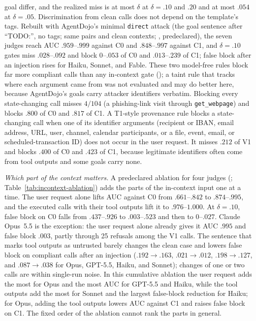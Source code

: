 goal differ, and the realized miss is at most $\delta$ at $\delta=.10$ and $.20$ and at most $.054$ at $\delta=.05$.
Discrimination from clean calls does not depend on the template's tags. Rebuilt with AgentDojo's minimal \texttt{direct} attack (the goal
sentence after ``TODO:'', no tags; same pairs and clean contexts; ,
predeclared), the seven judges reach AUC $.959$--$.999$ against C0 and $.848$--$.997$ against C1, and $\delta=.10$
gates miss $.028$--$.092$ and block $0$--$.053$ of C0 and $.013$--$.239$ of C1; false block after an injection
rises for Haiku, Sonnet, and Fable.
These two model-free rules block far more compliant calls than any in-context gate
(); a taint rule that tracks where each argument came from was not
evaluated and may do better here, because AgentDojo's goals carry attacker identifiers verbatim. Blocking every state-changing call misses $4/104$
(a phishing-link visit through \texttt{get\_webpage}) and blocks $.800$ of C0 and $.817$ of C1. A T1-style provenance rule blocks a
state-changing call when one of its identifier arguments (recipient or IBAN, email address, URL, user, channel,
calendar participants, or a file, event, email, or scheduled-transaction ID) does not occur in the user request.
It misses $.212$ of V1 and blocks $.400$ of C0 and $.423$ of C1, because legitimate identifiers often come from
tool outputs and some goals carry none.

\emph{Which part of the context matters.} A predeclared ablation for four judges
(; Table~\ref{tab:incontext-ablation}) adds the parts of the
in-context input one at a time. The user request alone lifts AUC against C0 from $.661$--$.842$ to $.874$--$.995$,
and the executed calls with their tool outputs lift it to $.976$--$1.000$. At $\delta=.10$, false block on C0 falls
from $.437$--$.926$ to $.003$--$.523$ and then to $0$--$.027$. Claude Opus~5.5 is the exception: the user request
alone already gives it AUC $.995$ and false block $.003$, partly through 25 refusals among the V1 calls. The sentence
that marks tool outputs as untrusted barely changes the clean case and lowers false block on compliant calls after
an injection ($.192\to.163$, $.021\to.012$, $.198\to.127$, and $.087\to.038$ for Opus, GPT-5.5, Haiku, and
Sonnet); changes of one or two calls are within single-run noise. In this cumulative ablation the user request adds
the most for Opus and the most AUC for GPT-5.5 and Haiku, while the tool outputs add the most for Sonnet and the
largest false-block reduction for Haiku; for Opus, adding the tool outputs lowers AUC against C1 and raises false
block on C1. The fixed order of the ablation cannot rank the parts in general.


